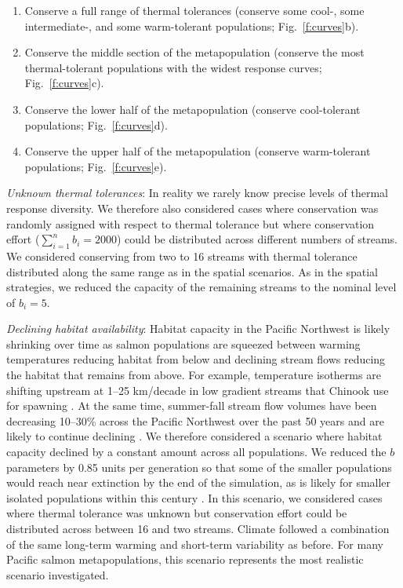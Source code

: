 \documentclass[12pt,english]{article}
\begin{document}
\begin{spacing}{1.9}
\begin{enumerate}
\def\labelenumi{\arabic{enumi}.}
\item
  Conserve a full range of thermal tolerances (conserve some cool-, some intermediate-, and some warm-tolerant populations; Fig.~\ref{f:curves}b).
\item
  Conserve the middle section of the metapopulation (conserve the most thermal-tolerant populations with the widest response curves; Fig.~\ref{f:curves}c).
\item
  Conserve the lower half of the metapopulation (conserve cool-tolerant populations; Fig.~\ref{f:curves}d).
\item
  Conserve the upper half of the metapopulation (conserve warm-tolerant populations; Fig.~\ref{f:curves}e).
\end{enumerate}

\emph{Unknown thermal tolerances}: In reality we rarely know precise levels of thermal response diversity. We therefore also considered cases where conservation was randomly assigned with respect to thermal tolerance but where conservation effort ($\sum\limits_{i=1}^n b_i = 2000$) could be distributed across different numbers of streams. We considered conserving from two to 16 streams with thermal tolerance distributed along the same range as in the spatial scenarios. As in the spatial strategies, we reduced the capacity of the remaining streams to the nominal level of $b_i = 5$.

\emph{Declining habitat availability}: Habitat capacity in the Pacific Northwest is likely shrinking over time as salmon populations are squeezed between warming temperatures reducing habitat from below and declining stream flows reducing the habitat that remains from above. For example, temperature isotherms are shifting upstream at 1--25 km/decade in low gradient streams that Chinook use for spawning \citep{isaak2013}. At the same time, summer-fall stream flow volumes have been decreasing 10--30\% across the Pacific Northwest over the past 50 years \citep{luce2009} and are likely to continue declining \citep{luce2013}. We therefore considered a scenario where habitat capacity declined by a constant amount across all populations. We reduced the $b$ parameters by 0.85 units per generation so that some of the smaller populations would reach near extinction by the end of the simulation, as is likely for smaller isolated populations within this century \citep[e.g.][]{gustafson2007}. In this scenario, we considered cases where thermal tolerance was unknown but conservation effort could be distributed across between 16 and two streams. Climate followed a combination of the same long-term warming and short-term variability as before. For many Pacific salmon metapopulations, this scenario represents the most realistic scenario investigated.


\end{spacing}
\end{document}
